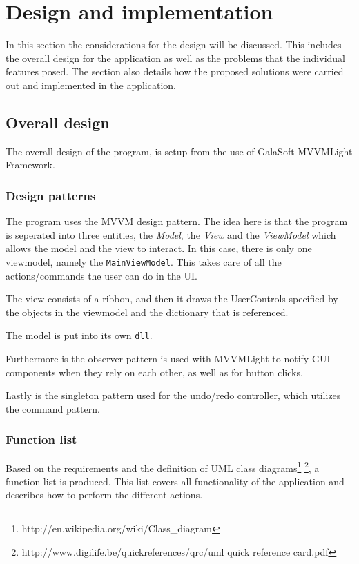 \section{Design and implementation}

In this section the considerations for the
design will be discussed. This includes the overall design for the application
as well as the problems that the individual features posed. The section also
details how the proposed solutions were carried out and implemented in the
application.

\subsection{Overall design}
The overall design of the program, is setup from the use of GalaSoft MVVMLight
Framework.

\subsubsection{Design patterns}

The program uses the MVVM design pattern. The idea here is that the program is
seperated into three entities, the \textit{Model}, the \textit{View} and the
\textit{ViewModel} which allows the model and the view to interact.
In this case, there is only one
viewmodel, namely the \texttt{MainViewModel}. This takes care of all the actions/commands
the user can do in the UI.

The view consists of a ribbon, and then it draws the UserControls specified by
the objects in the viewmodel and the dictionary that is referenced.

The model is put into its own \texttt{dll}.

Furthermore is the observer pattern is used with MVVMLight to notify GUI components 
when they rely on each other, as well as for button clicks.

Lastly is the singleton pattern used for the undo/redo controller, which
utilizes the command pattern.

\subsubsection{Function list}
Based on the requirements and the definition of UML class 
diagrams\footnote{http://en.wikipedia.org/wiki/Class\_diagram} 
\footnote{http://www.digilife.be/quickreferences/qrc/uml quick reference 
card.pdf}, a function list is produced. This list covers all functionality of 
the application and describes how to perform the different actions.

